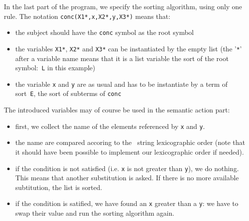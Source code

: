 \noindent
In the last part of the program, we specify the sorting algorithm,
using only one rule.
The notation \texttt{conc(X1*,x,X2*,y,X3*)} means that:
\begin{itemize}
\item the subject should have the \texttt{conc} symbol as the root
  symbol

\item the variables \texttt{X1*}, \texttt{X2*} and \texttt{X3*} can be
  instantiated by the empty list (the '\texttt{*}' after a variable
  name means that it is a list variable the sort of the root
  symbol:~\texttt{L} in this example) 

\item the variable \texttt{x} and \texttt{y} are as usual and has to
  be instantiate by a term of sort~\texttt{E}, the sort of subterms of
  \texttt{conc} 
\end{itemize}
The introduced variables may of course be used in the semantic action
part:
\begin{itemize}
\item first, we collect the name of the elements referenced by
  \texttt{x} and \texttt{y}.

\item the name are compared accoring to the \Java\ string
  lexicographic order (note that it should have been possible to
  implement our lexicographic order if needed).

\item if the condition is not satisfied (i.e. \texttt{x} is not
  greater than \texttt{y}), we do nothing. This means that another
  substitution is asked. If there is no more available subtitution,
  the list is sorted.

\item if the condition is satified, we have found an \texttt{x}
  greater than a \texttt{y}: we have to swap their value and run the
  sorting algorithm again.
\end{itemize}


